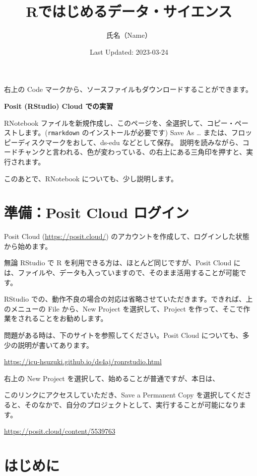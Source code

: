 \documentclass[
]{article}
\title{Rではじめるデータ・サイエンス}
\author{氏名（Name）}
\date{Last Updated: 2023-03-24}
\begin{document}
\maketitle

右上の Code マークから、ソースファイルもダウンロードすることができます。

\textbf{Posit (RStudio) Cloud での実習}

RNotebook
ファイルを新規作成し、このページを、全選択して、コピー・ペーストします。(\texttt{rmarkdown}
のインストールが必要です) Save As \ldots{}
または、フロッピーディスクマークをおして、ds-edu などとして保存。
説明を読みながら、コードチャンクと言われる、色が変わっている、の右上にある三角印を押すと、実行されます。

このあとで、RNotebook についても、少し説明します。

\hypertarget{ux6e96ux5099posit-cloud-ux30edux30b0ux30a4ux30f3}{%
\section{準備：Posit Cloud
ログイン}\label{ux6e96ux5099posit-cloud-ux30edux30b0ux30a4ux30f3}}

Posit Cloud (\url{https://posit.cloud/})
のアカウントを作成して、ログインした状態から始めます。

無論 RStudio で R を利用できる方は、ほとんど同じですが、Posit Cloud
には、ファイルや、データも入っていますので、そのまま活用することが可能です。

RStudio
での、動作不良の場合の対応は省略させていただきます。できれば、上のメニューの
File から、New Project を選択して、Project
を作って、そこで作業をされることをお勧めします。

問題がある時は、下のサイトを参照してください。Posit Cloud
についても、多少の説明が書いてあります。

\url{https://icu-hsuzuki.github.io/ds4aj/ronrstudio.html}

右上の New Project を選択して、始めることが普通ですが、本日は、

このリンクにアクセスしていただき、Save a Permanent Copy
を選択してくださると、そのなかで、自分のプロジェクトとして、実行することが可能になります。

\url{https://posit.cloud/content/5539763}

\hypertarget{ux306fux3058ux3081ux306b}{%
\section{はじめに}\label{ux306fux3058ux3081ux306b}}
\end{document}
